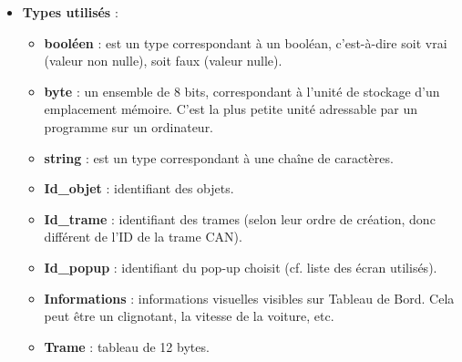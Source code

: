 \begin{itemize}
    \item \textbf{Types utilisés} :
        \begin{itemize}
            \item \textbf{booléen} : est un type correspondant à un booléan, c'est-à-dire soit vrai (valeur non nulle), soit faux (valeur nulle).
            \item \textbf{byte} : un ensemble de 8 bits, correspondant à l'unité de stockage d'un emplacement mémoire. C'est la plus petite unité adressable par un programme sur un ordinateur.
            \item \textbf{string} : est un type correspondant à une chaîne de caractères.
            \item \textbf{Id\_objet} : identifiant des objets.
            \item \textbf{Id\_trame} : identifiant des trames (selon leur ordre de création, donc différent de l'ID de la trame CAN).
            \item \textbf{Id\_popup} : identifiant du pop-up choisit (cf. liste des écran utilisés).
            \item \textbf{Informations} : informations visuelles visibles sur Tableau de Bord. Cela peut être un clignotant, la vitesse de la voiture, etc.
            \item \textbf{Trame} : tableau de 12 bytes.
        \end{itemize}
\end{itemize}










